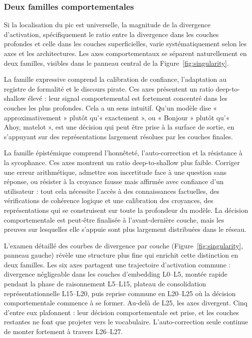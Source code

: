 \documentclass[11pt,a4paper]{article}
\begin{document}
\subsubsection{Deux familles comportementales}

Si la localisation du pic est universelle, la magnitude de la divergence d'activation, spécifiquement le ratio entre la divergence dans les couches profondes et celle dans les couches superficielles, varie systématiquement selon les axes et les architectures. Les axes comportementaux se séparent naturellement en deux familles, visibles dans le panneau central de la Figure~\ref{fig:singularity}.

La famille expressive comprend la calibration de confiance, l'adaptation au registre de formalité et le discours pirate. Ces axes présentent un ratio deep-to-shallow élevé : leur signal comportemental est fortement concentré dans les couches les plus profondes. Cela a un sens intuitif. Qu'un modèle dise « approximativement » plutôt qu'« exactement », ou « Bonjour » plutôt qu'« Ahoy, matelot », est une décision qui peut être prise à la surface de sortie, en s'appuyant sur des représentations largement résolues par les couches finales.

La famille épistémique comprend l'honnêteté, l'auto-correction et la résistance à la sycophance. Ces axes montrent un ratio deep-to-shallow plus faible. Corriger une erreur arithmétique, admettre son incertitude face à une question sans réponse, ou résister à la croyance fausse mais affirmée avec confiance d'un utilisateur : tout cela nécessite l'accès à des connaissances factuelles, des vérifications de cohérence logique et une calibration des croyances, des représentations qui se construisent sur toute la profondeur du modèle. La décision comportementale est peut-être finalisée à l'avant-dernière couche, mais les preuves sur lesquelles elle s'appuie sont plus largement distribuées dans le réseau.

L'examen détaillé des courbes de divergence par couche (Figure~\ref{fig:singularity}, panneau gauche) révèle une structure plus fine qui enrichit cette distinction en deux familles. Les six axes partagent une trajectoire d'activation commune : divergence négligeable dans les couches d'embedding L0--L5, montée rapide pendant la phase de raisonnement L5--L15, plateau de consolidation représentationnelle L15--L20, puis reprise commune en L20--L25 où la décision comportementale commence à se former. Au-delà de L25, les axes divergent. Cinq d'entre eux plafonnent : leur décision comportementale est prise, et les couches restantes ne font que projeter vers le vocabulaire. L'auto-correction seule continue de monter fortement à travers L26--L27.
\end{document}
